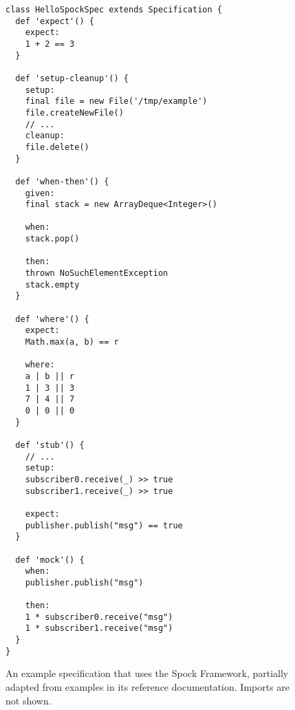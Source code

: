 \begin{figure}
  \begin{verbatim}
class HelloSpockSpec extends Specification {
  def 'expect'() {
    expect:
    1 + 2 == 3
  }

  def 'setup-cleanup'() {
    setup:
    final file = new File('/tmp/example')
    file.createNewFile()
    // ...
    cleanup:
    file.delete()
  }

  def 'when-then'() {
    given:
    final stack = new ArrayDeque<Integer>()

    when:
    stack.pop()

    then:
    thrown NoSuchElementException
    stack.empty
  }

  def 'where'() {
    expect:
    Math.max(a, b) == r

    where:
    a | b || r
    1 | 3 || 3
    7 | 4 || 7
    0 | 0 || 0
  }

  def 'stub'() {
    // ...
    setup:
    subscriber0.receive(_) >> true
    subscriber1.receive(_) >> true

    expect:
    publisher.publish("msg") == true
  }

  def 'mock'() {
    when:
    publisher.publish("msg")

    then:
    1 * subscriber0.receive("msg")
    1 * subscriber1.receive("msg")
  }
}
  \end{verbatim}
  \caption{
    An example specification that uses the Spock Framework,
    partially adapted from examples in its reference documentation.
    \autocite{SpockFrameworkDoc}
    Imports are not shown.
  }\label{fig:SpockTestExample}
\end{figure}
